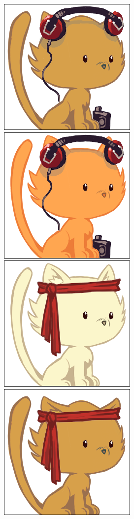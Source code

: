 \documentclass[a4paper, 12pt]{article}
\begin{document}
  \includegraphics[scale=0.45]{out/17.png}
  \includegraphics[scale=0.45]{out/18.png}
  \includegraphics[scale=0.45]{out/19.png}
  \includegraphics[scale=0.45]{out/20.png}
\end{document}
